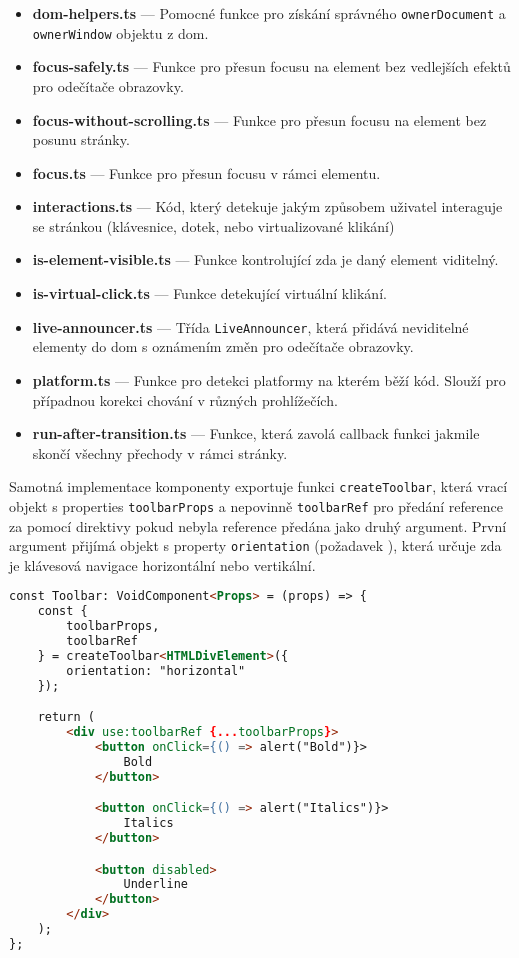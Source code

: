 \begin{itemize}
    \item \textbf{dom-helpers.ts} --- Pomocné funkce pro získání správného \texttt{ownerDocument} a \texttt{ownerWindow} objektu z \gls{dom}.
    \item \textbf{focus-safely.ts} --- Funkce pro přesun focusu na element bez vedlejších efektů pro odečítače obrazovky.
    \item \textbf{focus-without-scrolling.ts} --- Funkce pro přesun focusu na element bez posunu stránky.
    \item \textbf{focus.ts} --- Funkce pro přesun focusu v rámci elementu.
    \item \textbf{interactions.ts} --- Kód, který detekuje jakým způsobem uživatel interaguje se stránkou (klávesnice, dotek, nebo virtualizované klikání)
    \item \textbf{is-element-visible.ts} --- Funkce kontrolující zda je daný element viditelný.
    \item \textbf{is-virtual-click.ts} --- Funkce detekující virtuální klikání.
    \item \textbf{live-announcer.ts} --- Třída \texttt{LiveAnnouncer}, která přidává neviditelné elementy do \gls{dom} s oznámením změn pro odečítače obrazovky.
    \item \textbf{platform.ts} --- Funkce pro detekci platformy na kterém běží kód. Slouží pro případnou korekci chování v různých prohlížečích.
    \item \textbf{run-after-transition.ts} --- Funkce, která zavolá callback funkci jakmile skončí všechny přechody v rámci stránky.
\end{itemize}

Samotná implementace komponenty exportuje funkci \texttt{createToolbar}, která vrací objekt s properties \texttt{toolbarProps} a nepovinně \texttt{toolbarRef} pro předání reference za pomocí direktivy pokud nebyla reference předána jako druhý argument.
První argument přijímá objekt s property \texttt{orientation} (požadavek \hyperref[tfr12]{}), která určuje zda je klávesová navigace horizontální nebo vertikální.

\begin{lstlisting}[caption={Ukázka implementace Toolbar komponenty}, label={toolbar-example}, language=html]
const Toolbar: VoidComponent<Props> = (props) => {
    const {
        toolbarProps,
        toolbarRef
    } = createToolbar<HTMLDivElement>({
        orientation: "horizontal"
    });

    return (
        <div use:toolbarRef {...toolbarProps}>
            <button onClick={() => alert("Bold")}>
                Bold
            </button>

            <button onClick={() => alert("Italics")}>
                Italics
            </button>

            <button disabled>
                Underline
            </button>
        </div>
    );
};
\end{lstlisting}

